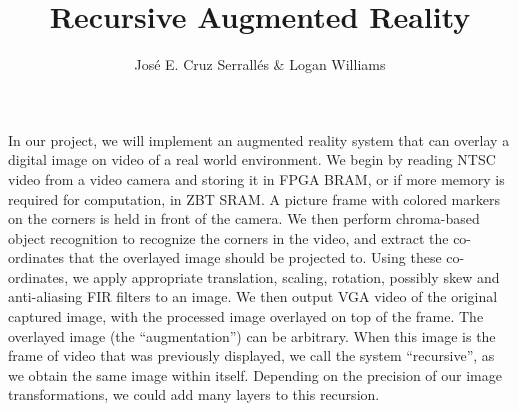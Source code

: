 \documentclass[11pt]{article}
\title{Recursive Augmented Reality}
\author{Jos\'{e} E. Cruz Serrall\'{e}s \& Logan Williams}
\date{}
\begin{document}
\maketitle


In our project, we will implement an augmented reality system that can overlay a digital image on video of a real world environment. We begin by reading NTSC video from a video camera and storing it in FPGA BRAM, or if more memory is required for computation, in ZBT SRAM. A picture frame with colored markers on the corners is held in front of the camera. We then perform chroma-based object recognition to recognize the corners in the video, and extract the co-ordinates that the overlayed image should be projected to. Using these co-ordinates, we apply appropriate translation, scaling, rotation, possibly skew and anti-aliasing FIR filters to an image. We then output VGA video of the original captured image, with the processed image overlayed on top of the frame. The overlayed image (the ``augmentation'') can be arbitrary. When this image is the frame of video that was previously displayed, we call the system ``recursive'', as we obtain the same image within itself. Depending on the precision of our image transformations, we could add many layers to this recursion.
\end{document}
